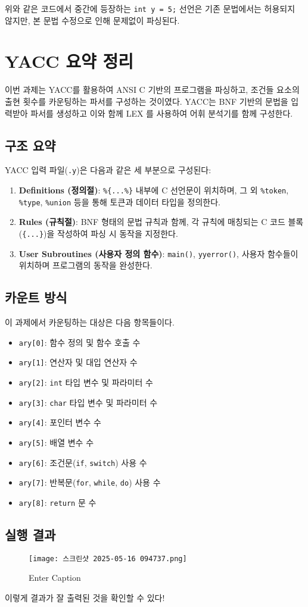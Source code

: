 \documentclass{article}
\begin{document}
위와 같은 코드에서 중간에 등장하는 \texttt{int y = 5;} 선언은 기존 문법에서는 허용되지 않지만, 본 문법 수정으로 인해 문제없이 파싱된다.

\section{YACC 요약 정리}

이번 과제는 YACC를 활용하여 ANSI C 기반의 프로그램을 파싱하고, 조건들 요소의 출현 횟수를 카운팅하는 파서를 구성하는 것이였다. YACC는 BNF 기반의 문법을 입력받아 파서를 생성하고 이와 함께 LEX 를 사용하여 어휘 분석기를 함께 구성한다.

\subsection*{구조 요약}

YACC 입력 파일(\texttt{.y})은 다음과 같은 세 부분으로 구성된다:

\begin{enumerate}
  \item \textbf{Definitions (정의절)}: \texttt{\%\{...\%\}} 내부에 C 선언문이 위치하며, 그 외 \texttt{\%token}, \texttt{\%type}, \texttt{\%union} 등을 통해 토큰과 데이터 타입을 정의한다.
  \item \textbf{Rules (규칙절)}: BNF 형태의 문법 규칙과 함께, 각 규칙에 매칭되는 C 코드 블록(\texttt{\{...\}})을 작성하여 파싱 시 동작을 지정한다.
  \item \textbf{User Subroutines (사용자 정의 함수)}: \texttt{main()}, \texttt{yyerror()}, 사용자 함수들이 위치하며 프로그램의 동작을 완성한다.
\end{enumerate}

\subsection*{카운트 방식}

이 과제에서 카운팅하는 대상은 다음 항목들이다.

\begin{itemize}
  \item \texttt{ary[0]}: 함수 정의 및 함수 호출 수
  \item \texttt{ary[1]}: 연산자 및 대입 연산자 수
  \item \texttt{ary[2]}: \texttt{int} 타입 변수 및 파라미터 수
  \item \texttt{ary[3]}: \texttt{char} 타입 변수 및 파라미터 수
  \item \texttt{ary[4]}: 포인터 변수 수
  \item \texttt{ary[5]}: 배열 변수 수
  \item \texttt{ary[6]}: 조건문(\texttt{if}, \texttt{switch}) 사용 수
  \item \texttt{ary[7]}: 반복문(\texttt{for}, \texttt{while}, \texttt{do}) 사용 수
  \item \texttt{ary[8]}: \texttt{return} 문 수
\end{itemize}

\subsection{실행 결과}

\begin{figure}
    \centering
    \texttt{[image: 스크린샷 2025-05-16 094737.png]}
    \caption{Enter Caption}
    \label{fig:enter-label}
\end{figure}

이렇게 결과가 잘 출력된 것을 확인할 수 있다!
\end{document}

